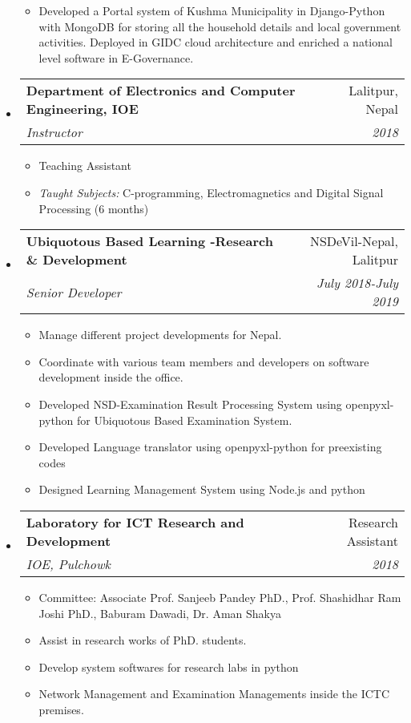 \documentclass[letterpaper,11pt]{article}
\makeatletter
\newcommand{\resitem}[1]{\item #1 \vspace{-2pt}}
\newcommand{\ressubheading}[4]{
\begin{tabular*}{6.5in}{l@{\cftdotfill{\cftsecdotsep}\extracolsep{\fill}}r}
		\textbf{#1} & #2 \\
		\textit{#3} & \textit{#4} \\
\end{tabular*}\vspace{-6pt}}
\makeatother
\begin{document}
\begin{itemize}
\begin{itemize}
	  \resitem{Developed a Portal system of Kushma Municipality in Django-Python with MongoDB for storing all the household details and local government activities. Deployed in GIDC cloud architecture and enriched a national level software in E-Governance.}

	\end{itemize}

\item[] \ressubheading{Department of Electronics and Computer Engineering, IOE}{Lalitpur, Nepal}{Instructor}{2018}
	\begin{itemize}
		\resitem{Teaching Assistant}
		\resitem{\textit{Taught Subjects:} C-programming, Electromagnetics and Digital Signal Processing (6 months)}
	\end{itemize}

\item[] \ressubheading{Ubiquotous Based Learning -Research \& Development}{NSDeVil-Nepal, Lalitpur}{Senior Developer}{July 2018-July 2019}
	\begin{itemize}
		\resitem{Manage different project developments for Nepal.}
		\resitem{Coordinate with various team members and developers on software development inside the office.}
		\resitem{Developed NSD-Examination Result Processing System using openpyxl-python for Ubiquotous Based Examination System.}
		\resitem{Developed Language translator using openpyxl-python for preexisting codes}
		\resitem{Designed Learning Management System using Node.js and python}
	\end{itemize}

\item[] \ressubheading{Laboratory for ICT Research and Development}{Research Assistant}{IOE, Pulchowk}{2018}
	\begin{itemize}
		\resitem{Committee: Associate Prof. Sanjeeb Pandey PhD., Prof. Shashidhar Ram Joshi PhD., Baburam Dawadi, Dr. Aman Shakya}
		\resitem{Assist in research works of PhD. students.}
		\resitem{Develop system softwares for research labs in python}
		\resitem{Network Management and Examination Managements inside the ICTC premises.}
	\end{itemize}



\end{itemize}
\end{document}

